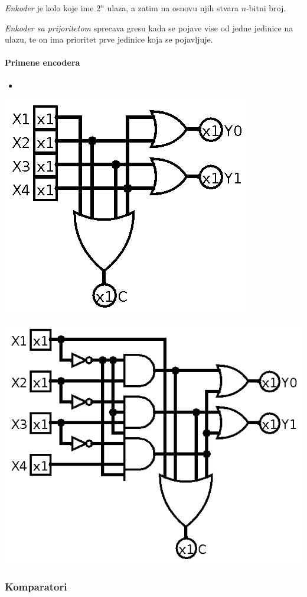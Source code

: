 \documentclass[12p,a4paper]{article}
\begin{document}
\begin{multicols}{2}
    \emph{Enkoder} je kolo koje ime $2^n$ ulaza, a zatim na osnovu njih stvara
    $n$-bitni broj.

    \emph{Enkoder sa prijoritetom} sprecava gresu kada se pojave vise od jedne
    jedinice na ulazu, te on ima prioritet prve jedinice koja se pojavljuje.

    \paragraph{Primene encodera}
    \begin{itemize}
        \itemsep0em
        \item 
    \end{itemize}
    \includegraphics[width=0.6\columnwidth]{Figures/encoder.png}

    \includegraphics[width=0.8\columnwidth]{Figures/priority_encoder.png}

    \subsubsection{Komparatori}


\end{multicols}
\end{document}
